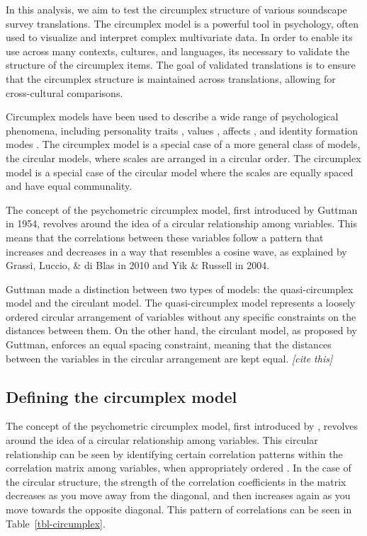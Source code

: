 \documentclass[
  authoryear,
  preprint,
  3p]{elsarticle}
\begin{document}
In this analysis, we aim to test the circumplex structure of various
soundscape survey translations. The circumplex model is a powerful tool
in psychology, often used to visualize and interpret complex
multivariate data. In order to enable its use across many contexts,
cultures, and languages, its necessary to validate the structure of the
circumplex items. The goal of validated translations is to ensure that
the circumplex structure is maintained across translations, allowing for
cross-cultural comparisons.

Circumplex models have been used to describe a wide range of
psychological phenomena, including personality traits
\citep{Wiggins1979}, values \citep{Schwartz2012}, affects
\citep{Russell1980circumplex}, and identity formation modes
\citep{Cieciuch2017}. The circumplex model is a special case of a more
general class of models, the circular models, where scales are arranged
in a circular order. The circumplex model is a special case of the
circular model where the scales are equally spaced and have equal
communality.

The concept of the psychometric circumplex model, first introduced by
Guttman in 1954, revolves around the idea of a circular relationship
among variables. This means that the correlations between these
variables follow a pattern that increases and decreases in a way that
resembles a cosine wave, as explained by Grassi, Luccio, \& di Blas in
2010 and Yik \& Russell in 2004.

Guttman made a distinction between two types of models: the
quasi-circumplex model and the circulant model. The quasi-circumplex
model represents a loosely ordered circular arrangement of variables
without any specific constraints on the distances between them. On the
other hand, the circulant model, as proposed by Guttman, enforces an
equal spacing constraint, meaning that the distances between the
variables in the circular arrangement are kept equal. \emph{{[}cite
this{]}}

\subsection{Defining the circumplex
model}\label{defining-the-circumplex-model}

The concept of the psychometric circumplex model, first introduced by
\citet{Guttman1954new}, revolves around the idea of a circular
relationship among variables. This circular relationship can be seen by
identifying certain correlation patterns within the correlation matrix
among variables, when appropriately ordered
\citep{Browne1992Circumplex}. In the case of the circular structure, the
strength of the correlation coefficients in the matrix decreases as you
move away from the diagonal, and then increases again as you move
towards the opposite diagonal. This pattern of correlations can be seen
in Table~\ref{tbl-circumplex}.
\end{document}
